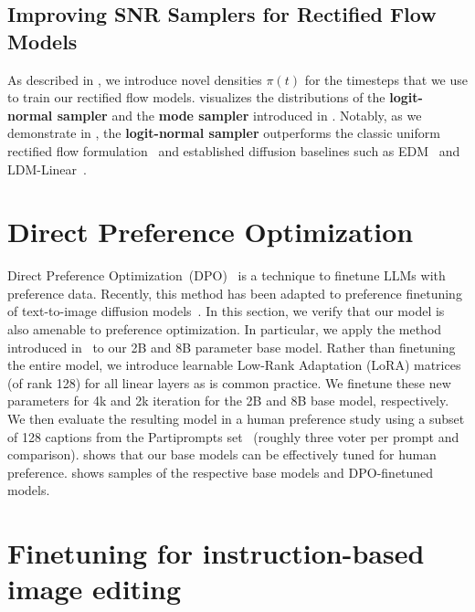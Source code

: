 \subsection{Improving SNR Samplers for Rectified Flow Models}
As described in , we introduce novel densities $\pi(t)$ for the timesteps
that we use to train our rectified flow models.  visualizes the distributions of the \textbf{logit-normal sampler} and the \textbf{mode sampler} introduced in . Notably, as we demonstrate in , the \textbf{logit-normal sampler} outperforms the classic uniform rectified flow formulation~\citep{liu2022flow} and established diffusion baselines such as EDM~\citep{Karras2022ElucidatingTD} and LDM-Linear~\citep{Rombach_2022}.
\tsamplers
%

%
%
%
%
%
%
%

%

\figqualitativescaleparti

\section{Direct Preference Optimization}
\label{supsec:dpo}
\figdpo
\figdpohumaneval
Direct Preference Optimization~(DPO)~\citep{rafailov2023direct} is a technique to finetune LLMs with preference data. Recently, this method has been adapted to preference finetuning of text-to-image diffusion models~\citep{wallace2023diffusion}. In this section, we verify that our model is also amenable to preference optimization. In particular, we apply the method introduced in~\citet{wallace2023diffusion} to our 2B and 8B parameter base model. Rather than finetuning the entire model, we introduce learnable Low-Rank Adaptation (LoRA) matrices (of rank 128) for all linear layers as is common practice. We finetune these new parameters for 4k and 2k iteration for the 2B and 8B base model, respectively. We then evaluate the resulting model in a human preference study using a subset of 128 captions from the Partiprompts set~\citep{yu2022scaling} (roughly three voter per prompt and comparison).  shows that our base models can be effectively tuned for human preference.  shows samples of the respective base models and DPO-finetuned models.

\section{Finetuning for instruction-based image editing}

